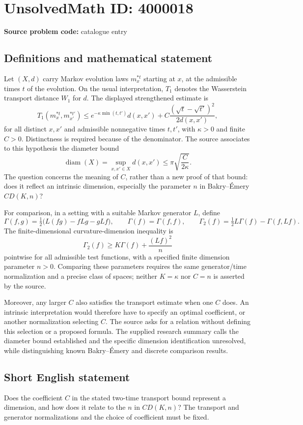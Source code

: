 \documentclass[11pt]{article}
\begin{document}
\section*{UnsolvedMath ID: 4000018}
\textbf{Source problem code:} catalogue entry
\subsection{Definitions and mathematical statement}
Let \((X,d)\) carry Markov evolution laws \(m_x^{*t}\) starting at \(x\), at the admissible times \(t\) of the evolution. On the usual interpretation, \(T_1\) denotes the Wasserstein transport distance \(W_1\) for \(d\). The displayed strengthened estimate is
\[
T_1(m_x^{*t},m_{x'}^{*t'})\le
 e^{-\kappa\min(t,t')}d(x,x')+
 C\frac{(\sqrt t-\sqrt{t'})^2}{2d(x,x')},
\]
for all distinct \(x,x'\) and admissible nonnegative times \(t,t'\), with \(\kappa>0\) and finite \(C>0\). Distinctness is required because of the denominator. The source associates to this hypothesis the diameter bound
\[
\operatorname{diam}(X)=\sup_{x,x'\in X}d(x,x')
\le\pi\sqrt{\frac{C}{2\kappa}}.
\]
The question concerns the meaning of \(C\), rather than a new proof of that bound: does it reflect an intrinsic dimension, especially the parameter \(n\) in Bakry--Émery \(CD(K,n)\)?

For comparison, in a setting with a suitable Markov generator \(L\), define
\[
\Gamma(f,g)=\tfrac12\bigl(L(fg)-fLg-gLf\bigr),\qquad
\Gamma(f)=\Gamma(f,f),\qquad
\Gamma_2(f)=\tfrac12L\Gamma(f)-\Gamma(f,Lf).
\]
The finite-dimensional curvature-dimension inequality is
\[
\Gamma_2(f)\ge K\Gamma(f)+\frac{(Lf)^2}{n}
\]
pointwise for all admissible test functions, with a specified finite dimension parameter \(n>0\). Comparing these parameters requires the same generator/time normalization and a precise class of spaces; neither \(K=\kappa\) nor \(C=n\) is asserted by the source.

Moreover, any larger \(C\) also satisfies the transport estimate when one \(C\) does. An intrinsic interpretation would therefore have to specify an optimal coefficient, or another normalization selecting \(C\). The source asks for a relation without defining this selection or a proposed formula. The supplied research summary calls the diameter bound established and the specific dimension identification unresolved, while distinguishing known Bakry--Émery and discrete comparison results.
\subsection{Short English statement}
Does the coefficient \(C\) in the stated two-time transport bound represent a dimension, and how does it relate to the \(n\) in \(CD(K,n)\)? The transport and generator normalizations and the choice of coefficient must be fixed.
\end{document}
